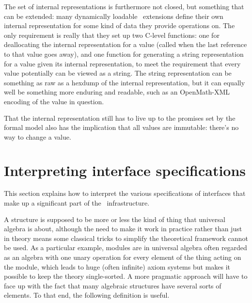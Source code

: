\documentclass{mtmtcl}
\theoremstyle{plain}
\theoremstyle{remark}
\begin{document}
The set of internal representations is furthermore not closed, but 
something that can be extended: many dynamically loadable \Tcl\ 
extensions define their own internal representation for some kind of 
data they provide operations on. The only requirement is really that 
they set up two C-level functions: one for deallocating the internal 
representation for a value (called when the last reference to that 
value goes away), and one function for generating a string 
representation for a value given its internal representation, to meet 
the requirement that every value potentially can be viewed as a string. 
The string representation can be something as raw as a hexdump of the 
internal representation, but it can equally well be something more 
enduring and readable, such as an OpenMath-XML encoding of the value 
in question. 

That the internal representation still has to live up to the promises 
set by the formal model also has the implication that all values are 
immutable: there's no way to change a value.






\section{Interpreting interface specifications}

This section explains how to interpret the various specifications of 
interfaces that make up a significant part of the \mtl\ 
infrastructure.

A structure is supposed to be more or less the kind of thing that 
universal algebra is about, although the need to make it work in 
practice rather than just in theory means some classical tricks to 
simplify the theoretical framework cannot be used. As a particular 
example, modules are in universal algebra often regarded as an 
algebra with one unary operation for every element of the thing 
acting on the module, which leads to huge (often infinite) axiom 
systems but makes it possible to keep the theory single-sorted. A 
more pragmatic approach will have to face up with the fact that many 
algebraic structures have several sorts of elements. To that end, the 
following definition is useful.
\end{document}
